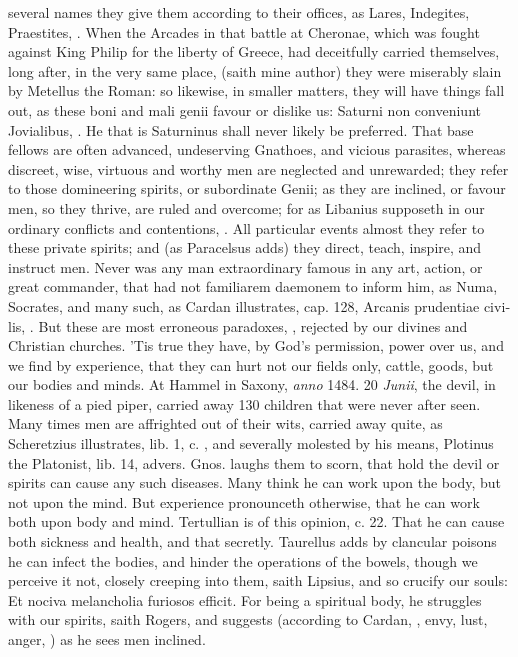 {{several names they give them according to their offices, as Lares,
Indegites, Praestites, \etc{}. When the Arcades in that battle at Cheronae,
which was fought against King Philip for the liberty of Greece, had
deceitfully carried themselves, long after, in the very same place,
 (saith mine author) they were miserably slain
by Metellus the Roman: so likewise, in smaller matters, they will have
things fall out, as these boni and mali genii favour or dislike us:
Saturni non conveniunt Jovialibus, \etc{}. He that is Saturninus shall
never likely be preferred. That base fellows are often advanced,
undeserving Gnathoes, and vicious parasites, whereas discreet, wise,
virtuous and worthy men are neglected and unrewarded; they refer to
those domineering spirits, or subordinate Genii; as they are inclined,
or favour men, so they thrive, are ruled and overcome; for as
Libanius supposeth in our ordinary conflicts and contentions,
. All
particular events almost they refer to these private spirits; and (as
Paracelsus adds) they direct, teach, inspire, and
instruct men. Never was any man extraordinary famous in any art,
action, or great commander, that had not familiarem daemonem to inform
him, as Numa, Socrates, and many such, as Cardan illustrates, cap. 128,
\textlatin{Arcanis prudentiae civilis},  . But
these are most erroneous paradoxes, ,
rejected by our divines and Christian churches. 'Tis true they have, by
God's permission, power over us, and we find by experience, that they
can hurt not our fields only, cattle, goods, but our bodies and
minds. At Hammel in Saxony, \emph{anno} 1484. 20 \emph{Junii}, the devil, in
likeness of a pied piper, carried away 130 children that were never
after seen. Many times men are affrighted out of their wits,
carried away quite, as Scheretzius illustrates, lib. 1, c. , and
severally molested by his means, Plotinus the Platonist, lib. 14,
advers. Gnos. laughs them to scorn, that hold the devil or spirits can
cause any such diseases. Many think he can work upon the body, but not
upon the mind. But experience pronounceth otherwise, that he can work
both upon body and mind. Tertullian is of this opinion, c. 22.
That he can cause both sickness and health, and that secretly.
Taurellus adds by clancular poisons he can infect the bodies, and
hinder the operations of the bowels, though we perceive it not, closely
creeping into them, saith Lipsius, and so crucify our souls: Et
nociva melancholia furiosos efficit. For being a spiritual body, he
struggles with our spirits, saith Rogers, and suggests (according to
Cardan, , envy, lust, anger,
\etc{}) as he sees men inclined.

}}
